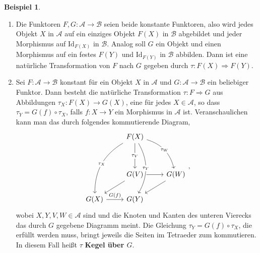 \documentclass[leqno]{article}
\theoremstyle{plain}
\theoremstyle{definition}
\newtheorem{exmp}{Beispiel}[section]
\theoremstyle{remark}
\begin{document}
\begin{exmp}
\begin{enumerate}
	\item Die Funktoren $F,G: \mathcal{A} \rightarrow \mathcal{B}$ seien beide konstante Funktoren, also wird jedes Objekt $X$ in $\mathcal{A}$ auf ein einziges Objekt $F(X)$ in $\mathcal{B}$ abgebildet und jeder Morphismus auf $\text{Id}_{F(X)}$ in $\mathcal{B}$. Analog soll $G$ ein Objekt und einen Morphismus auf ein festes $F(Y)$ und $\text{Id}_{F(Y)}$ in $\mathcal{B}$ abbilden. Dann ist eine natürliche Transformation von $F$ nach $G$ gegeben durch $\tau: F(X) \Longrightarrow F(Y)$.
	\item Sei $F: \mathcal{A} \rightarrow \mathcal{B}$ konstant für ein Objekt $X$ in $\mathcal{A}$ und $G: \mathcal{A} \rightarrow \mathcal{B}$ ein beliebiger Funktor. Dann besteht die natürliche Transformation $\tau: F \Longrightarrow G$ aus Abbildungen $\tau_{X}: F(X) \rightarrow G(X)$, eine für jedes $X \in \mathcal{A}$, so dass $\tau_Y = G(f) \circ \tau_X$, falls $f:X \rightarrow Y$ ein Morphismus in $\mathcal{A}$ ist. Veranschaulichen kann man das durch folgendes kommutierende Diagram, 
	\begin{equation}
		\begin{tikzcd}
		               & F(X) \arrow[lddd, "\tau_X" description, bend right] \arrow[dd, "\tau_V" description] \arrow[rdd, "\tau_W" description, bend left] \arrow[ddd, "\tau_Y" description, bend left] &                 \\
		               &                                                                                                                                                                             &                 \\
		               & G(V) \arrow[r] \arrow[ld]                                                                                                                                                   & G(W) \arrow[ld] \\
		G(X) \arrow[r, "G(f)"] & G(Y)                                                                                                                                                                        &                
		\end{tikzcd},
	\end{equation}
	wobei $X,Y,V,W \in \mathcal{A}$ sind und die Knoten und Kanten des unteren Vierecks das durch $G$ gegebene Diagramm meint. Die Gleichung $\tau_Y = G(f) \circ \tau_X$, die erfüllt werden muss, bringt jeweils die Seiten im Tetraeder zum kommutieren. In diesem Fall heißt $\tau$ \textbf{Kegel über $G$}.

\end{enumerate}
\end{exmp}
\end{document}
